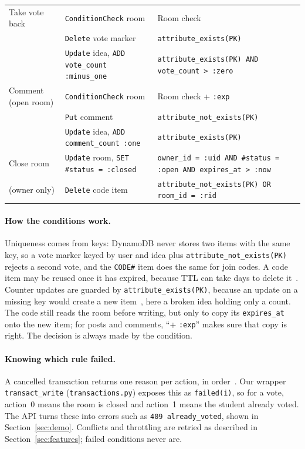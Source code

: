 \begin{table}[htbp]
\begin{tabularx}{\linewidth}{@{}>{\raggedright\arraybackslash}p{2.5cm}l>{\raggedright\arraybackslash}X@{}}
    \addlinespace
    Take vote back & \texttt{ConditionCheck} room & Room check \\
     & \texttt{Delete} vote marker & \texttt{attribute\_exists(PK)} \\
     & \texttt{Update} idea, \texttt{ADD vote\_count :minus\_one} &
      \texttt{attribute\_exists(PK) AND vote\_count \textgreater{} :zero} \\
    \addlinespace
    Comment (open room) & \texttt{ConditionCheck} room & Room check + \texttt{:exp} \\
     & \texttt{Put} comment & \texttt{attribute\_not\_exists(PK)} \\
     & \texttt{Update} idea, \texttt{ADD comment\_count :one} & \texttt{attribute\_exists(PK)} \\
    \addlinespace
    Close room & \texttt{Update} room, \texttt{SET \#status = :closed} &
      \texttt{owner\_id = :uid AND \#status = :open AND expires\_at \textgreater{} :now} \\
    (owner only) & \texttt{Delete} code item &
      \texttt{attribute\_not\_exists(PK) OR room\_id = :rid} \\
    \bottomrule
  \end{tabularx}
\end{table}

\paragraph{How the conditions work.} Uniqueness comes from keys: DynamoDB never stores two items
with the same key, so a vote marker keyed by user and idea plus
\texttt{attribute\_not\_exists(PK)} rejects a second vote, and the \texttt{CODE\#} item does the
same for join codes. A code item may be reused once it has expired, because TTL can take days to
delete it~\cite{ttl}. Counter updates are guarded by \texttt{attribute\_exists(PK)}, because an
update on a missing key would create a new item~\cite{update-expressions}, here a broken idea
holding only a count. The code still reads the room before writing, but only to copy its
\texttt{expires\_at} onto the new item; for posts and comments, ``+ \texttt{:exp}'' makes sure
that copy is right. The decision is always made by the condition.

\paragraph{Knowing which rule failed.} A cancelled transaction returns one reason per action, in
order~\cite{transactions, transactwriteitems}. Our wrapper \texttt{transact\_write}
(\texttt{transactions.py}) exposes this as \texttt{failed(i)}, so for a vote, action~0 means the
room is closed and action~1 means the student already voted. The API turns these into errors
such as \texttt{409 already\_voted}, shown in Section~\ref{sec:demo}. Conflicts and throttling
are retried as described in Section~\ref{sec:features}; failed conditions never are.

